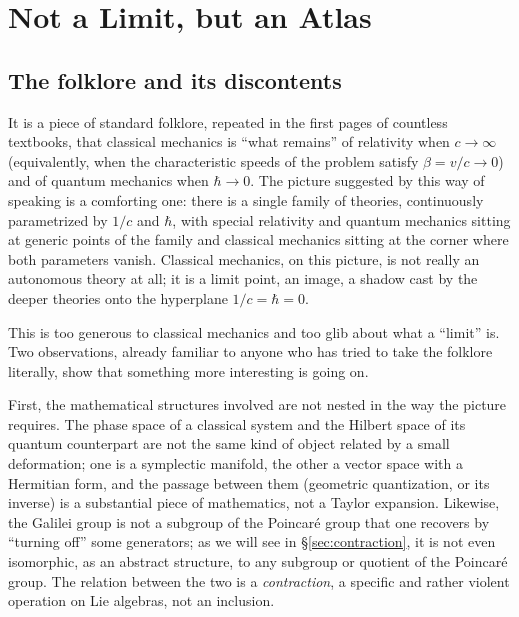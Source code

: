 
\chapter{Not a Limit, but an Atlas}
\label{ch:singular-limit}

\section{The folklore and its discontents}

It is a piece of standard folklore, repeated in the first pages of countless
textbooks, that classical mechanics is ``what remains'' of relativity when
$c\to\infty$ (equivalently, when the characteristic speeds of the problem
satisfy $\beta = v/c \to 0$) and of quantum mechanics when $\hbar\to 0$. The
picture suggested by this way of speaking is a comforting one: there is a
single family of theories, continuously parametrized by $1/c$ and $\hbar$, with
special relativity and quantum mechanics sitting at generic points of the
family and classical mechanics sitting at the corner where both parameters
vanish. Classical mechanics, on this picture, is not really an autonomous
theory at all; it is a limit point, an image, a shadow cast by the deeper
theories onto the hyperplane $1/c=\hbar=0$.

This is too generous to classical mechanics and too glib about what a ``limit''
is. Two observations, already familiar to anyone who has tried to take the
folklore literally, show that something more interesting is going on.

First, the mathematical structures involved are not nested in the way the
picture requires. The phase space of a classical system and the Hilbert space
of its quantum counterpart are not the same kind of object related by a small
deformation; one is a symplectic manifold, the other a vector space with a
Hermitian form, and the passage between them (geometric quantization, or its
inverse) is a substantial piece of mathematics, not a Taylor expansion.
Likewise, the Galilei group is not a subgroup of the Poincar\'e group that one
recovers by ``turning off'' some generators; as we will see in
\S\ref{sec:contraction}, it is not even isomorphic, as an abstract structure,
to any subgroup or quotient of the Poincar\'e group. The relation between the
two is a \emph{contraction}, a specific and rather violent operation on Lie
algebras, not an inclusion.

